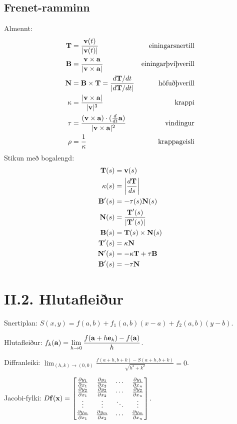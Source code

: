 \subsection*{Frenet-ramminn}
Almennt:
\begin{align*}
    \mbox{${\bf T}$} &= \frac {\mbox{${\bf v}$} (t)}{|\mbox{${\bf v}$}(t)|} & \text{einingarsnertill}\\
    \mbox{${\bf B}$} &= \frac{\mbox{${\bf v}$} \times \mbox{${\bf a}$}}{|\mbox{${\bf v}$} \times \mbox{${\bf a}$}|} & \text{einingarþvíþverill}\\
    \mbox{${\bf N}$} &= \mbox{${\bf B}$} \times \mbox{${\bf T}$} = \frac {d\mbox{${\bf T}$}/dt}{|d\mbox{${\bf T}$}/dt|} & \text{höfuðþverill}\\
    \kappa &= \frac{|\mbox{${\bf v}$} \times \mbox{${\bf a}$}|}{|\mbox{${\bf v}$}|^3} & \text{krappi}\\
    \tau &= \frac{(\mbox{${\bf v}$} \times \mbox{${\bf a}$}) \cdot (\frac d{dt}\mbox{${\bf a}$})}{|\mbox{${\bf v}$}\times \mbox{${\bf a}$}|^2} & \text{vindingur}\\
    \rho &= \frac 1\kappa & \text{krappageisli}\\
\end{align*}
Stikun með bogalengd:
\begin{align*}
    \mbox{${\bf T}$}(s) &= \mbox{${\bf v}$}(s)\\
    \kappa(s) &= \left| \frac {d\mbox{${\bf T}$}}{ds}\right|\\
	\mbox{${\bf B}$}'(s) &= -\tau(s) \mbox{${\bf N}$}(s)\\
	\mbox{${\bf N}$}(s) &= \frac {\mbox{${\bf T}$}'(s)}{|\mbox{${\bf T}$}'(s)|}\\
	\mbox{${\bf B}$}(s) &= \mbox{${\bf T}$}(s) \times \mbox{${\bf N}$}(s)\\
	\mbox{${\bf T}$}'(s) &= \kappa \mbox{${\bf N}$} \\
	\mbox{${\bf N}$}'(s) &= -\kappa \mbox{${\bf T}$} + \tau \mbox{${\bf B}$}\\
	\mbox{${\bf B}$}'(s) &= -\tau \mbox{${\bf N}$}
\end{align*}
\section*{II.2. Hlutafleiður}
Snertiplan: $S(x,y) = f(a,b) + f_1(a,b)(x-a) + f_2(a,b)(y-b)$.

Hlutafleiður: $\displaystyle f_k(\mbox{${\bf a}$}) = \lim_{h\to 0} \frac{f(\mbox{${\bf a}$}+h\mbox{${\bf e}$}_k)-f(\mbox{${\bf a}$})}h$.

Diffranleiki: $\displaystyle \lim_{(h,k) \to (0,0)} \frac{f(a+h,b+k)-S(a+h,b+k)}{\sqrt{h^2+k^2}}=0$.

Jacobi-fylki: $D\mbox{${\bf f}$}(\mbox{${\bf x}$}) = \begin{bmatrix}
\frac{\partial y_1}{\partial x_1}&\frac{\partial y_1}{\partial x_2}&
\cdots&\frac{\partial y_1}{\partial x_n}\\
\frac{\partial y_2}{\partial x_1}&\frac{\partial y_2}{\partial x_2}&
\cdots&\frac{\partial y_2}{\partial x_n}\\
\vdots&\vdots&\ddots&\vdots\\
\frac{\partial y_m}{\partial x_1}&\frac{\partial y_m}{\partial x_2}&
\cdots&\frac{\partial y_m}{\partial x_n}
\end{bmatrix}$.

